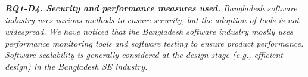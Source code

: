 \begin{tcolorbox}[flushleft upper,boxrule=1pt,arc=0pt,left=0pt,right=0pt,top=0pt,bottom=0pt,colback=white,after=\ignorespacesafterend\par\noindent]
\nd\it{\bf{RQ1-D4. Security and performance measures used.}} Bangladesh software
industry uses various methods to ensure security, but the adoption of tools is not widespread. 
We have noticed that the Bangladesh
software industry mostly uses performance monitoring tools and software testing
to ensure product performance. Software scalability is generally considered at
the design stage (e.g., efficient design) in the Bangladesh SE industry. 
\end{tcolorbox}